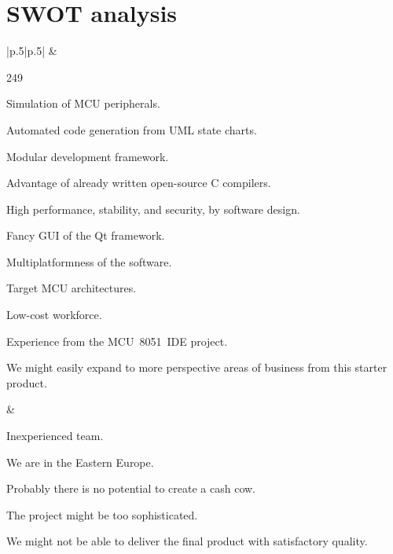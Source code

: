 \documentclass[a4paper,twoside,15pt]{book}
\begin{document}
	\clearpage
	\section{SWOT analysis}
		\begin{table}[h!]
			\centering{}
			\begin{tabular}{|p{.5\textwidth}|p{}|}
					&  \\

				\begin{dinglist}{249}
					\setlength{\itemsep}{-3pt}
					\item Simulation of MCU peripherals.
					\item Automated code generation from UML state charts.
					\item Modular development framework.
					\item Advantage of already written open-source C compilers.
					\item High performance, stability, and security, by software design.
					\item Fancy GUI of the Qt framework.
					\item Multiplatformness of the software.
					\item Target MCU architectures.
					\item Low-cost workforce.
					\item Experience from the MCU~8051~IDE project.
					\item We might easily expand to more perspective areas of business from this starter product.
				\end{dinglist}	&

				\begin{dinglist}{74}
					\setlength{\itemsep}{-3pt}
					\item Inexperienced team.
					\item We are in the Eastern Europe.
					\item Probably there is no potential to create a cash cow.
					\item The project might be too sophisticated.
					\item We might not be able to deliver the final product with satisfactory quality.
				\end{dinglist}	\\


\end{tabular}
\end{table}
\end{document}
